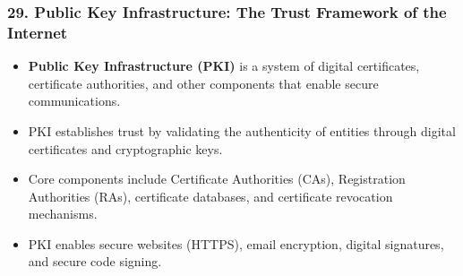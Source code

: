 \documentclass{beamer}
\begin{document}
		\begin{frame}
			\frametitle{29. Public Key Infrastructure: The Trust Framework of the Internet}
			\begin{itemize}
				\item \textbf{Public Key Infrastructure (PKI)} is a system of digital certificates, certificate authorities, and other components that enable secure communications.
				\item PKI establishes trust by validating the authenticity of entities through digital certificates and cryptographic keys.
				\item Core components include Certificate Authorities (CAs), Registration Authorities (RAs), certificate databases, and certificate revocation mechanisms.
				\item PKI enables secure websites (HTTPS), email encryption, digital signatures, and secure code signing.
			\end{itemize}
			
		\end{frame}
		
\end{document}
